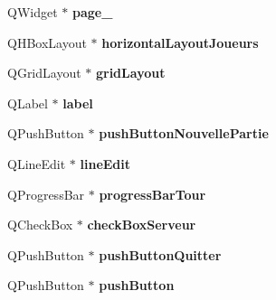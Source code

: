 \begin{DoxyCompactItemize}
\item 
\hypertarget{classUi__MainWindow_adcb6de4cebc6760fe319711f125010cc}{Q\-Widget $\ast$ {\bfseries page\-\_}}\label{classUi__MainWindow_adcb6de4cebc6760fe319711f125010cc}

\item 
\hypertarget{classUi__MainWindow_a9a43633211d56018140b0d718e9fcc2e}{Q\-H\-Box\-Layout $\ast$ {\bfseries horizontal\-Layout\-Joueurs}}\label{classUi__MainWindow_a9a43633211d56018140b0d718e9fcc2e}

\item 
\hypertarget{classUi__MainWindow_a525ed3c5fe0784ac502ee222fba4e205}{Q\-Grid\-Layout $\ast$ {\bfseries grid\-Layout}}\label{classUi__MainWindow_a525ed3c5fe0784ac502ee222fba4e205}

\item 
\hypertarget{classUi__MainWindow_ad9c89133780f28e6efa2ec17ceb9cff5}{Q\-Label $\ast$ {\bfseries label}}\label{classUi__MainWindow_ad9c89133780f28e6efa2ec17ceb9cff5}

\item 
\hypertarget{classUi__MainWindow_ad96a0a746b68d03e700e0bf4c899d389}{Q\-Push\-Button $\ast$ {\bfseries push\-Button\-Nouvelle\-Partie}}\label{classUi__MainWindow_ad96a0a746b68d03e700e0bf4c899d389}

\item 
\hypertarget{classUi__MainWindow_a7a5b9a4633d64f502ce81da3202d828c}{Q\-Line\-Edit $\ast$ {\bfseries line\-Edit}}\label{classUi__MainWindow_a7a5b9a4633d64f502ce81da3202d828c}

\item 
\hypertarget{classUi__MainWindow_a5731ca480b84d22f9c8e94027e86e0c2}{Q\-Progress\-Bar $\ast$ {\bfseries progress\-Bar\-Tour}}\label{classUi__MainWindow_a5731ca480b84d22f9c8e94027e86e0c2}

\item 
\hypertarget{classUi__MainWindow_a49a1c4dfac38d9cc35bcff6f58f17a47}{Q\-Check\-Box $\ast$ {\bfseries check\-Box\-Serveur}}\label{classUi__MainWindow_a49a1c4dfac38d9cc35bcff6f58f17a47}

\item 
\hypertarget{classUi__MainWindow_a87c454e9f790f364183054ad3596ea82}{Q\-Push\-Button $\ast$ {\bfseries push\-Button\-Quitter}}\label{classUi__MainWindow_a87c454e9f790f364183054ad3596ea82}

\item 
\hypertarget{classUi__MainWindow_ad332d93084584930878f1daf5f84cdbf}{Q\-Push\-Button $\ast$ {\bfseries push\-Button}}\label{classUi__MainWindow_ad332d93084584930878f1daf5f84cdbf}


\end{DoxyCompactItemize}
